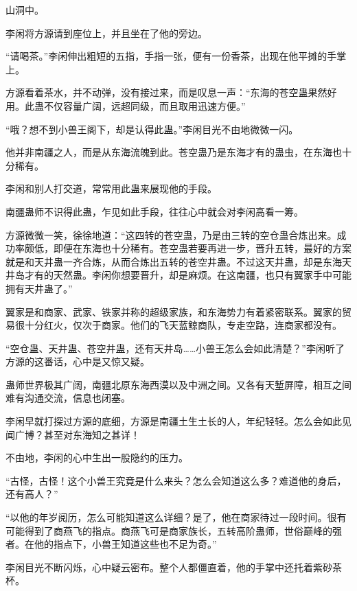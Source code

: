 
\begin{this_body}



山洞中。

李闲将方源请到座位上，并且坐在了他的旁边。

“请喝茶。”李闲伸出粗短的五指，手指一张，便有一份香茶，出现在他平摊的手掌上。

方源看着茶水，并不动弹，没有接过来，而是叹息一声：“东海的苍空蛊果然好用。此蛊不仅容量广阔，远超同级，而且取用迅速方便。”

“哦？想不到小兽王阁下，却是认得此蛊。”李闲目光不由地微微一闪。

他并非南疆之人，而是从东海流魄到此。苍空蛊乃是东海才有的蛊虫，在东海也十分稀有。

李闲和别人打交道，常常用此蛊来展现他的手段。

南疆蛊师不识得此蛊，乍见如此手段，往往心中就会对李闲高看一筹。

方源微微一笑，徐徐地道：“这四转的苍空蛊，乃是由三转的空仓蛊合炼出来。成功率颇低，即便在东海也十分稀有。苍空蛊若要再进一步，晋升五转，最好的方案就是和天井蛊一齐合炼，从而合炼出五转的苍空井蛊。不过这天井蛊，却是东海天井岛才有的天然蛊。李闲你想要晋升，却是麻烦。在这南疆，也只有翼家手中可能拥有天井蛊了。”

翼家是和商家、武家、铁家并称的超级家族，和东海势力有着紧密联系。翼家的贸易很十分红火，仅次于商家。他们的飞天蓝鲸商队，专走空路，连商家都没有。

“空仓蛊、天井蛊、苍空井蛊，还有天井岛……小兽王怎么会如此清楚？”李闲听了方源的这番话，心中是又惊又疑。

蛊师世界极其广阔，南疆北原东海西漠以及中洲之间。又各有天堑屏障，相互之间难有沟通交流，信息也闭塞。

李闲早就打探过方源的底细，方源是南疆土生土长的人，年纪轻轻。怎么会如此见闻广博？甚至对东海知之甚详！

不由地，李闲的心中生出一股隐约的压力。

“古怪，古怪！这个小兽王究竟是什么来头？怎么会知道这么多？难道他的身后，还有高人？”

“以他的年岁阅历，怎么可能知道这么详细？是了，他在商家待过一段时间。很有可能得到了商燕飞的指点。商燕飞可是商家族长，五转高阶蛊师，世俗巅峰的强者。在他的指点下，小兽王知道这些也不足为奇。”

李闲目光不断闪烁，心中疑云密布。整个人都僵直着，他的手掌中还托着紫砂茶杯。


\end{this_body}
